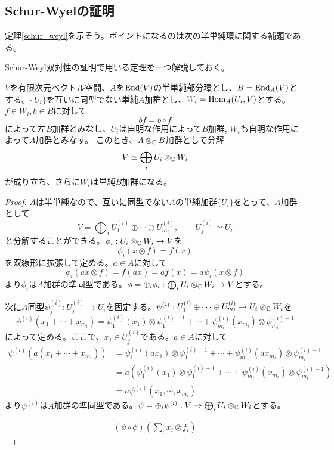 \documentclass{ltjsreport}
\begin{document}
\subsection{Schur-Wyelの証明}



定理\ref{schur_weyl}を示そう。ポイントになるのは次の半単純環に関する補題である。

Schur-Weyl双対性の証明で用いる定理を一つ解説しておく。

\begin{lemm}\label{DCT}
  $V$を有限次元ベクトル空間、$A$を$\text{End}(V)$の半単純部分環とし、$B=\text{End}_A(V)$とする。$\{U_i\}$を互いに同型でない単純$A$加群とし、$W_i=\text{Hom}_A(U_i,V)$とする。$f\in W_i, b\in B$に対して
  \[ 
  bf=b\circ f
  \]
  によって左$B$加群とみなし、$U_i$は自明な作用によって$B$加群, $W_i$も自明な作用によって$A$加群とみなす。
  このとき、$A\otimes_{\mathbb{C}} B$加群として分解
  \[
  V\simeq \bigoplus_iU_i\otimes_{\mathbb{C}} W_i  
  \]
  が成り立ち、さらに$W_i$は単純$B$加群になる。
\end{lemm}

\begin{proof}
  $A$は半単純なので、互いに同型でない$A$の単純加群$\{U_i\}$をとって、$A$加群として
  \[
  V= \bigoplus_i U^{(i)}_1\oplus\cdots\oplus U^{(i)}_{m_i},\qquad U^{(i)}_j\simeq U_i
  \]
  と分解することができる。$\phi_i:U_i\otimes_{\mathbb{C}} W_i\rightarrow V$を
  \[
  \phi_i(x\otimes f)=f(x)  
  \]
  を双線形に拡張して定める。$a\in A$に対して
  \[
  \phi_i(ax\otimes f)=f(ax)=af(x)=a\psi_i(x\otimes f)
  \]
  より$\phi_i$は$A$加群の準同型である。$\phi=\oplus_{i}\phi_i:\bigoplus_iU_i\otimes_{\mathbb{C}}W_i\rightarrow V$とする。

  次に$A$同型$\psi^{(i)}_j:U^{(i)}_j\rightarrow U_i$を固定する。$\psi^{(i)}:U^{(i)}_1\oplus\cdots\oplus U^{(i)}_{m_i}\rightarrow U_i\otimes_{\mathbb{C}}W_i$を
  \[
  \psi^{(i)}(x_1+\cdots+x_{m_i})
  =\psi^{(i)}_1(x_1)\otimes \psi^{(i)-1}_1
   +\cdots
   +\psi^{(i)}_{m_i}(x_{m_i})\otimes \psi^{(i)-1}_{m_i}
  \]
  によって定める。ここで、$x_j\in U^{(i)}_j$である。$a\in A$に対して
  \begin{align*}
  \psi^{(i)}(a(x_1+\cdots+x_{m_i}))  
  &=\psi^{(i)}_1(ax_1)\otimes \psi^{(i)-1}_1
  +\cdots
  +\psi^{(i)}_{m_i}(ax_{m_i})\otimes \psi^{(i)-1}_{m_i}\\
  &=a(\psi^{(i)}_1(x_1)\otimes \psi^{(i)-1}_1
  +\cdots
  +\psi^{(i)}_{m_i}(x_{m_i})\otimes \psi^{(i)-1}_{m_i})\\
  &=a\psi^{(i)}(x_1,\cdots,x_{m_i})
  \end{align*}
  より$\psi^{(i)}$は$A$加群の準同型である。$\psi=\oplus_i\psi^{(i)}:V\rightarrow\bigoplus_{i}U_i\otimes_{\mathbb{C}}W_i$とする。

  \begin{align*}
    (\psi\circ\phi)(\sum_ix_i\otimes f_i)
  \end{align*}
\end{proof}
\end{document}
